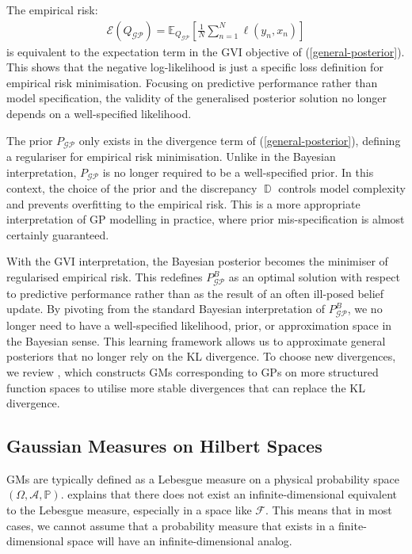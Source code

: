 \documentclass{article}
\newcommand{\D}{\operatorname{\mathbb{D}}}
\newcommand{\GP}{\operatorname{\mathcal{GP}}}
\numberwithin{equation}{section}
\begin{document}
The empirical risk: 
\begin{align}
\mathcal{E}(Q_{\GP}) = \mathbb{E}_{Q_{\GP}}\left[\frac{1}{N}\sum_{n=1}^N \ell\left(y_n, x_n\right)\right]
\label{empirical-risk}
\end{align}
is equivalent to the expectation term in the GVI objective of (\ref{general-posterior}). This shows that the negative log-likelihood is just a specific loss definition for empirical risk minimisation. Focusing on predictive performance rather than model specification, the validity of the generalised posterior solution no longer depends on a well-specified likelihood.

The prior $P_{\GP}$ only exists in the divergence term of (\ref{general-posterior}), defining a regulariser for empirical risk minimisation. Unlike in the Bayesian interpretation, $P_{\GP}$ is no longer required to be a well-specified prior. In this context, the choice of the prior and the discrepancy $\D$ controls model complexity and prevents overfitting to the empirical risk. This is a more appropriate interpretation of GP modelling in practice, where prior mis-specification is almost certainly guaranteed.

With the GVI interpretation, the Bayesian posterior becomes the minimiser of regularised empirical risk. This redefines $P_{\GP}^B$ as an optimal solution with respect to predictive performance rather than as the result of an often ill-posed belief update. By pivoting from the standard Bayesian interpretation of $P_{\GP}^B$, we no longer need to have a well-specified likelihood, prior, or approximation space in the Bayesian sense. This learning framework allows us to approximate general posteriors that no longer rely on the KL divergence. To choose new divergences, we review \cite{wild2022generalized}, which constructs GMs corresponding to GPs on more structured function spaces to utilise more stable divergences that can replace the KL divergence.

\subsection{Gaussian Measures on Hilbert Spaces}
GMs are typically defined as a Lebesgue measure on a physical probability space $(\Omega, \mathcal{A}, \mathbb{P})$. \cite{matthews2017scalable} explains that there does not exist an infinite-dimensional equivalent to the Lebesgue measure, especially in a space like $\mathcal{F}$. This means that in most cases, we cannot assume that a  probability measure that exists in a finite-dimensional space will have an infinite-dimensional analog.
\end{document}
